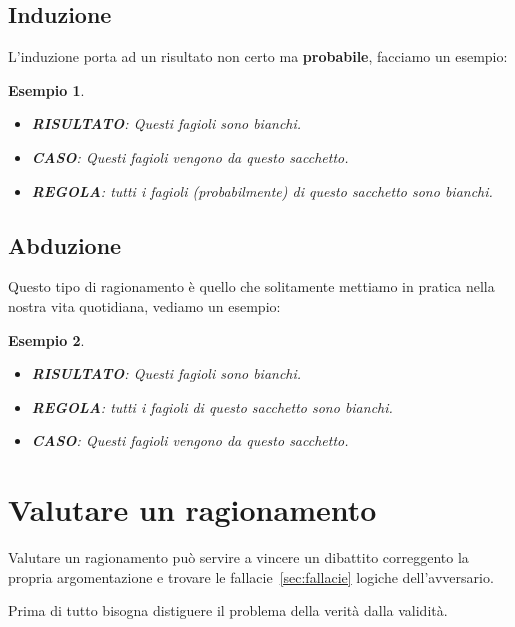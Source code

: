 \documentclass{article}
\newtheorem{exmp}{Esempio}[section]
\theoremstyle{definition}
\begin{document}
\subsection{Induzione}
L'induzione porta ad un risultato non certo ma \textbf{probabile}, facciamo un esempio:
\begin{exmp}
        \begin{itemize}
                \item \textbf{RISULTATO}: Questi fagioli sono bianchi. 
                \item\textbf{CASO}: Questi fagioli vengono da questo sacchetto.
                \item\textbf{REGOLA}: tutti i fagioli (probabilmente) di questo sacchetto sono bianchi.
        \end{itemize}
\end{exmp}



\subsection{Abduzione}
Questo tipo di ragionamento è quello che solitamente mettiamo in pratica nella nostra vita quotidiana, vediamo un esempio:
\begin{exmp}
        \begin{itemize}
                \item \textbf{RISULTATO}: Questi fagioli sono bianchi. 
                \item\textbf{REGOLA}: tutti i fagioli di questo sacchetto sono bianchi.
                \item\textbf{CASO}: Questi fagioli vengono da questo sacchetto.
        \end{itemize}
\end{exmp}






\newpage
\section{Valutare un ragionamento}
Valutare un ragionamento può servire a vincere un dibattito correggento la propria argomentazione e trovare le fallacie~\ref{sec:fallacie} logiche dell'avversario. \par

\begin{tcolorbox}
Prima di tutto bisogna distiguere il problema della verità dalla validità.
\end{tcolorbox}
\end{document}
